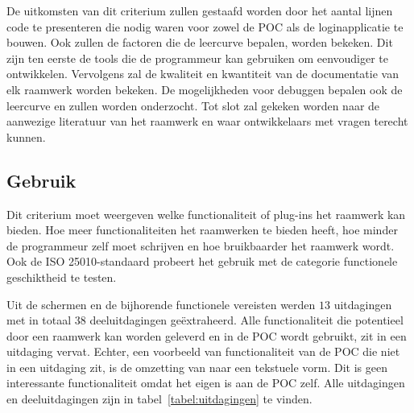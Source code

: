 De uitkomsten van dit criterium zullen gestaafd worden door het aantal lijnen code te presenteren die nodig waren voor zowel de POC als de loginapplicatie te bouwen.
Ook zullen de factoren die de leercurve bepalen, worden bekeken. 
Dit zijn ten eerste de tools die de programmeur kan gebruiken om eenvoudiger te ontwikkelen.
Vervolgens zal de kwaliteit en kwantiteit van de documentatie van elk raamwerk worden bekeken.
De mogelijkheden voor debuggen bepalen ook de leercurve en zullen worden onderzocht.
Tot slot zal gekeken worden naar de aanwezige literatuur van het raamwerk en waar ontwikkelaars met vragen terecht kunnen.


\subsection{Gebruik}
\label{sec:vergelijking-gebruik}
Dit criterium moet weergeven welke functionaliteit of plug-ins het raamwerk kan bieden.
Hoe meer functionaliteiten het raamwerken te bieden heeft,  hoe minder de programmeur zelf moet schrijven en hoe bruikbaarder het raamwerk wordt.
Ook de ISO 25010-standaard probeert het gebruik met de categorie functionele geschiktheid te testen.

Uit de  schermen en de bijhorende functionele vereisten werden $13$ uitdagingen met in totaal $38$ deeluitdagingen geëxtraheerd.
Alle functionaliteit die potentieel door een raamwerk kan worden geleverd en in de POC wordt gebruikt, zit in een uitdaging vervat.  
Echter, een voorbeeld van functionaliteit van de POC die niet in een uitdaging zit, is de omzetting van  naar een tekstuele vorm.
Dit is geen interessante functionaliteit omdat het eigen is aan de POC zelf.
Alle uitdagingen en deeluitdagingen zijn in tabel~\ref{tabel:uitdagingen} te vinden.


